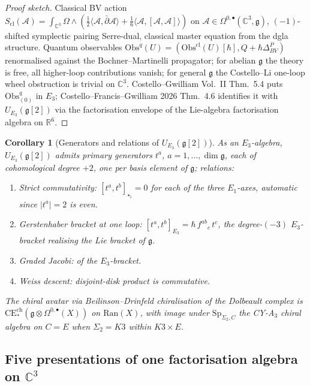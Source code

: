 \documentclass[11pt]{amsart}
\providecommand{\C}{\mathbb{C}}
\providecommand{\R}{\mathbb{R}}
\providecommand{\dbar}{\bar{\partial}}
\providecommand{\g}{\mathfrak{g}}
\providecommand{\cA}{\mathcal{A}}
\providecommand{\Obs}{\mathrm{Obs}}
\providecommand{\Sp}{\mathrm{Sp}}
\providecommand{\Ran}{\mathrm{Ran}}
\providecommand{\Eone}{E_1}
\providecommand{\Ethree}{E_3}
\theoremstyle{plain}
\newtheorem{corollary}[theorem]{Corollary}
\theoremstyle{definition}
\theoremstyle{remark}
\begin{document}
\begin{proof}[Proof sketch]
Classical BV action
$S_{\mathrm{cl}}(\cA)=\int_{\C^3}\Omega\wedge(\tfrac12\langle\cA,\dbar\cA\rangle
+\tfrac16\langle\cA,[\cA,\cA]\rangle)$ on
$\cA\in\Omega^{0,\bullet}(\C^3,\g)$, $(-1)$-shifted symplectic pairing
Serre-dual, classical master equation from the dgla structure. Quantum
observables $\Obs^{q}(U)=(\Obs^{\mathrm{cl}}(U)[\hbar], Q+\hbar\Delta^P_{BV})$
renormalised against the Bochner--Martinelli propagator; for abelian
$\g$ the theory is free, all higher-loop contributions vanish; for
general $\g$ the Costello--Li one-loop wheel obstruction is trivial on
$\C^3$. Costello--Gwilliam Vol.~II Thm.~5.4 puts
$\Obs^{q}_{(0)}$ in $\Ethree$; Costello--Francis--Gwilliam 2026
Thm.~4.6 identifies it with $U_{\Ethree}(\g[2])$ via the
factorisation envelope of the Lie-algebra factorisation algebra on
$\R^6$.
\end{proof}

\begin{corollary}[{Generators and relations of $U_{\Ethree}(\g[2])$}]
\label{cor:gen-rel-E3}
As an $\Ethree$-algebra, $U_{\Ethree}(\g[2])$ admits primary generators
$t^a$, $a=1,\ldots,\dim\g$, each of cohomological degree $+2$, one
per basis element of $\g$; relations:
\begin{enumerate}
\item \emph{Strict commutativity}: $[t^a,t^b]_{\star_i}=0$ for each of
the three $\Eone$-axes, automatic since $|t^a|=2$ is even.
\item \emph{Gerstenhaber bracket at one loop}:
$[t^a,t^b]_{\Ethree}=\hbar\,f^{ab}{}_c\, t^c$, the degree-$(-3)$
$\Ethree$-bracket realising the Lie bracket of $\g$.
\item \emph{Graded Jacobi}: of the $\Ethree$-bracket.
\item \emph{Weiss descent}: disjoint-disk product is commutative.
\end{enumerate}
The chiral avatar via Beilinson--Drinfeld chiralisation of the
Dolbeault complex is
$\mathrm{CE}^{\mathrm{ch}}_\ast(\g\otimes\Omega^{0,\bullet}(X))$ on
$\Ran(X)$, with image under $\Sp_{\Sigma_2,C}$ the CY-A$_3$
chiral algebra on $C=E$ when $\Sigma_2=K3$ within $K3\times E$.
\end{corollary}

\subsection{Five presentations of one factorisation algebra on $\C^3$}
\end{document}
